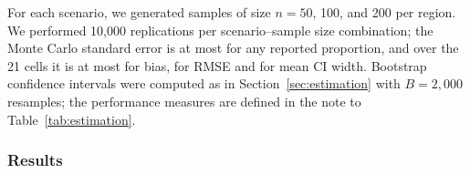 \documentclass[AMA,Times1COL]{WileyNJDv5}
\begin{document}
For each scenario, we generated samples of size $n = 50$, 100, and 200 per region. We performed 10{,}000 replications per scenario--sample size combination; the Monte Carlo standard error is at most  for any reported proportion, and over the 21 cells it is at most  for bias,  for RMSE and  for mean CI width. Bootstrap confidence intervals were computed as in Section~\ref{sec:estimation} with $B = 2{,}000$ resamples; the performance measures are defined in the note to Table~\ref{tab:estimation}.


\subsubsection{Results}\label{sec:sim_results}
\end{document}

